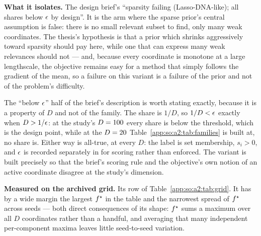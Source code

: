 \textbf{What it isolates.} The design brief's ``sparsity failing
(Lasso-DNA-like); all shares below $\epsilon$ by design''. It is the arm where
the sparse prior's central assumption is false: there is no small relevant
subset to find, only many weak coordinates. The thesis's hypothesis is that a
prior which shrinks aggressively toward sparsity should pay here, while one
that can express many weak relevances should not --- and, because every
coordinate is monotone at a large lengthscale, the objective remains easy for a
method that simply follows the gradient of the mean, so a failure on this
variant is a failure of the prior and not of the problem's difficulty.

The ``below $\epsilon$'' half of the brief's description is worth stating
exactly, because it is a property of $D$ and not of the family. The share is
$1/D$, so $1/D<\epsilon$ exactly when $D>1/\epsilon$: at the study's
$D=100$ every share is below the threshold, which is the design point,
while at the $D=20$ Table~\ref{app:so:a2:tab:families} is built at,
no share is. Either way  is all-true, at every $D$: the
label is set membership, $s_i>0$, and $\epsilon$ is recorded separately in
 for scoring rather than enforced. The variant is
built precisely so that the brief's scoring rule and the objective's own notion
of an active coordinate disagree at the study's dimension.

\textbf{Measured on the archived grid.} Its row of
Table~\ref{app:so:a2:tab:grid}. It has by a wide margin the largest $f^\star$ in
the table and the narrowest spread of $f^\star$ across seeds --- both direct
consequences of its shape: $f^\star$ sums a maximum over all $D$ coordinates
rather than a handful, and averaging that many independent per-component maxima
leaves little seed-to-seed variation.
